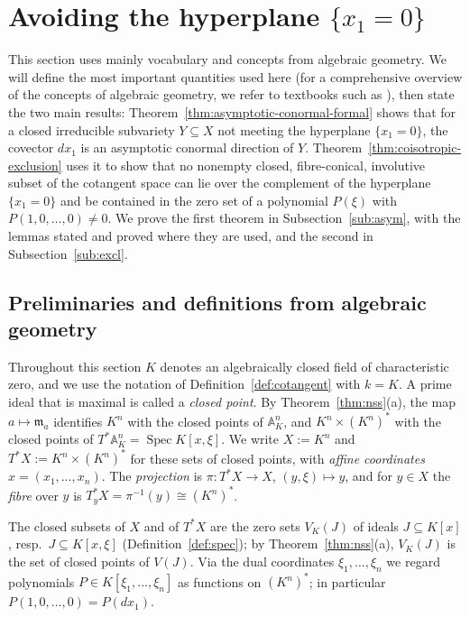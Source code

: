 \documentclass[pdflatex,sn-mathphys-num]{sn-jnl}
\numberwithin{equation}{section}
\theoremstyle{thmstyleone}
\theoremstyle{thmstyletwo}
\begin{document}
\section{Avoiding the hyperplane $\{x_1 = 0\}$}\label{sec:conormal-review}
This section uses mainly vocabulary and concepts from algebraic geometry. We will define the most important quantities used here (for a comprehensive overview of the concepts of algebraic geometry, we refer to textbooks such as \cite{hartshorne}), then state the two main results: Theorem~\ref{thm:asymptotic-conormal-formal}
shows that for a closed irreducible subvariety $Y\subseteq X$ not meeting the hyperplane
$\{x_1=0\}$, the covector $dx_1$ is an asymptotic conormal direction of $Y$.
Theorem~\ref{thm:coisotropic-exclusion} uses it to show that no nonempty closed,
fibre-conical, involutive subset of the cotangent space can lie over the complement
of the hyperplane $\{x_1=0\}$ and be contained in the zero set of a polynomial
$P(\xi)$ with $P(1,0,\dots,0)\neq0$.
We prove the first theorem in Subsection~\ref{sub:asym}, with the lemmas stated and
proved where they are used, and the second in Subsection~\ref{sub:excl}.
\subsection{Preliminaries and definitions from algebraic geometry}\label{sub:def_geom}
Throughout this section $K$ denotes an algebraically closed field of characteristic
zero, and we use the notation of Definition~\ref{def:cotangent} with $k=K$. A prime
ideal that is maximal is called a \emph{closed point}. By Theorem~\ref{thm:nss}(a),
the map $a\mapsto\mathfrak m_a$ identifies $K^n$ with the closed points of
$\mathbb A^n_K$, and $K^n\times(K^n)^*$ with the closed points of
$T^*\mathbb A^n_K=\operatorname{Spec}K[x,\xi]$. We write
$X:=K^n$ and $T^*X:=K^n\times(K^n)^*$ for these sets of closed points, with
\emph{affine coordinates} $x=(x_1,\dots,x_n)$. The \emph{projection} is $\pi\colon T^*X\to X$, $(y,\xi)\mapsto y$, and for
$y\in X$ the \emph{fibre} over $y$ is $T_y^*X=\pi^{-1}(y)\cong(K^n)^*$.

The closed subsets of $X$ and of $T^*X$ are the zero sets $V_K(J)$ of ideals
$J\subseteq K[x]$, resp.\ $J\subseteq K[x,\xi]$ (Definition~\ref{def:spec}); by
Theorem~\ref{thm:nss}(a), $V_K(J)$ is the set of closed points of $V(J)$. Via the dual coordinates
$\xi_1,\dots,\xi_n$ we regard polynomials $P\in K[\xi_1,\dots,\xi_n]$ as functions on
$(K^n)^*$; in particular $P(1,0,\dots,0)=P(dx_1)$. 
\end{document}
